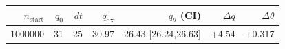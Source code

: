 \begin{tabular}{r r r r r r r}
\hline
$n_{\mathrm{start}}$ & $q_0$ & $dt$ & $q_{\mathrm{dx}}$ & $q_{\theta}$ (CI) & $\Delta q$ & $\Delta\theta$ \\
\hline
1000000 & 31 & 25 & 30.97 & 26.43 [26.24,26.63] & +4.54 & +0.317 \\
\hline
\end{tabular}
